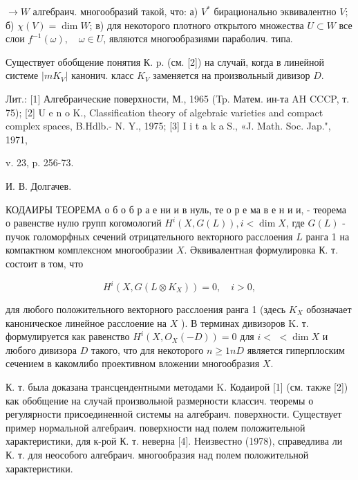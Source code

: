 \documentclass[10pt]{article}
\begin{document}
$\rightarrow W$ алгебраич. многообразий такой, что: а) $V^{*}$ бирационально эквивалентно $V$; б) $\chi(V)=\operatorname{dim} W$; в) для некоторого плотного открытого множества $U \subset W$ все слои $f^{-1}(\omega), \quad \omega \in U$, являются многообразиями параболич. типа.



Существует обобщение понятия К. p. (см. [2]) на случай, когда в линейной системе $\left|m K_{V}\right|$ канонич. класс $K_{V}$ заменяется на произвольный дивизор $D$.



Лит.: [1] Алгебраические поверхности, М., 1965 (Tp. Матем. ин-та AH CCCP, т. 75); [2] U e n o K., Classification theory of algebraic varieties and compact complex spaces, B.Hdlb.- N. Y., 1975; [3] I i t a k a S., «J. Math. Soc. Jap.", 1971,

v. 23, p. 256-73.

И. В. Долгачев.



КОДАИРЫ ТЕОРЕМА о б о б р а е ни и в нуль, те о р е ма в е н и и, - теорема о равенстве нулю групп когомологий $H^{i}(X, G(L)), i<\operatorname{dim} X$, где $G(L)$ - пучок голоморфных сечений отрицательного векторного расслоения $L$ ранга 1 на компактном комплексном многообразии $X$. Әквивалентная формулировка $К$. т. состоит в том, что



\[

H^{i}\left(X, G\left(L \otimes K_{X}\right)\right)=0, \quad i>0,

\]



для любого положительного векторного расслоения ранга 1 (здесь $K_{X}$ обозначает каноническое линейное расслоение на $X$ ). В терминах дивизоров $\mathrm{K}$. т. формулируется как равенство $H^{i}\left(X, O_{X}(-D)\right)=0$ для $i<$ $<\operatorname{dim} X$ и любого дивизора $D$ такого, что для некоторого $n \geqslant 1 n D$ является гиперплоским сечением в какомлибо проективном вложении многообразия $X$.



К. т. была доказана трансцендентными методами $\mathrm{K}$. Кодаирой [1] (см. также [2]) как обобщение на случай произвольной размерности классич. теоремы о регулярности присоединенной системы на алгебраич. поверхности. Существует пример нормальной алгебраич. поверхности над полем положительной характеристики, для к-рой К. т. неверна [4]. Неизвестно (1978), справедлива ли К. т. для неособого алгебраич. многообразия над полем положительной характеристики.
\end{document}
